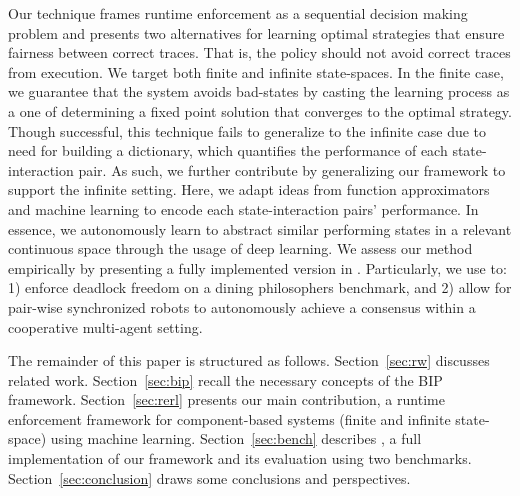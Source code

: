 Our technique frames runtime enforcement as a sequential decision making problem and presents two alternatives for learning optimal strategies that ensure fairness between correct traces. 
%
That is, the policy should not avoid correct traces from execution. 
%
We target both finite and infinite state-spaces. In the finite case, we guarantee that the system avoids bad-states by casting the learning process as a one of determining a fixed point solution that converges to the optimal strategy. Though successful, this technique fails to generalize to the infinite case due to need for building a dictionary, which quantifies the performance of each state-interaction pair. As such, we further contribute by generalizing our framework to support the infinite setting. Here, we adapt ideas from function approximators and machine learning to encode each state-interaction pairs' performance. In essence, we autonomously learn to abstract similar performing states in a relevant continuous space through the usage of deep learning. 
%
We assess our method empirically by presenting a fully implemented version in \rerl. Particularly, we use \rerl to: 1) enforce deadlock freedom on a dining philosophers benchmark, and 2) allow for pair-wise synchronized robots to autonomously achieve a consensus within a cooperative multi-agent setting. 


The remainder of this paper is structured as follows. Section~\ref{sec:rw} discusses related work. Section~\ref{sec:bip} recall the necessary concepts of the BIP framework. Section~\ref{sec:rerl} presents our main contribution, a runtime enforcement framework for component-based systems (finite and infinite state-space) using machine learning. Section~\ref{sec:bench} describes \rerl, a full implementation
of our framework and its evaluation using two benchmarks. Section~\ref{sec:conclusion} draws
some conclusions and perspectives. 